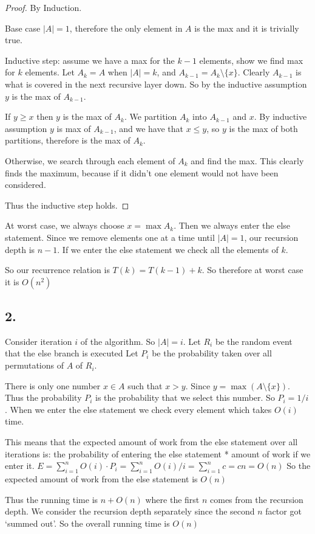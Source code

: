 \documentclass[11pt]{article}
\begin{document}
\begin{proof}
    By Induction.

    Base case $|A| = 1$, therefore the only element in $A$ is the max and it is trivially true.

    Inductive step: assume we have a max for the $k-1$ elements, show we find max for $k$ elements.
    Let $A_k = A$ when $|A| = k$, and $A_{k-1} = A_k \setminus \{x\}$.
    Clearly $A_{k-1}$ is what is covered in the next recursive layer down. 
    So by the inductive assumption $y$ is the max of $A_{k-1}$.

    If $y \geq x$ then $y$ is the max of $A_k$. We partition $A_k$ into $A_{k-1}$ and ${x}$.
    By inductive assumption $y$ is max of $A_{k-1}$, and we have that $x \leq y$, so $y$
    is the max of both partitions, therefore is the max of $A_k$.

    Otherwise, we search through each element of $A_k$ and find the max. This clearly
    finds the maximum, because if it didn't one element would not have been considered. 

    Thus the inductive step holds.
\end{proof}

At worst case, we always choose $x = \max A_k$. Then we always enter the else statement.
Since we remove elements one at a time until $|A| = 1$, our recursion depth is $n-1$.
If we enter the else statement we check all the elements of $k$.

So our recurrence relation is $T(k) = T(k-1) + k$. So therefore at worst case it is $O(n^2)$


\subsection*{2. }

Consider iteration $i$ of the algorithm. So $|A| = i$.
Let $R_i$ be the random event that the else branch is executed
Let $P_i$ be the probability taken over all permutations of $A$ of $R_i$.

There is only one number $x \in A$ such that $x > y$. Since $y = \max (A \setminus \{x\})$.
Thus the probability $P_i$ is the probability that we select this number. So $P_i = 1/i$.
When we enter the else statement we check every element which takes $O(i)$ time.

This means that the expected amount of work from the else statement over all iterations is:
the probability of entering the else statement * amount of work if we enter it.
$E = \sum_{i = 1} ^n O(i) \cdot P_i = \sum_{i = 1} ^n O(i)/i = \sum_{i = 1} ^n c = cn = O(n)$
So the expected amount of work from the else statement is $O(n)$

Thus the running time is $n + O(n)$ where the first $n$ comes from the recursion depth.
We consider the recursion depth separately since the second $n$ factor got `summed out'.
So the overall running time is $O(n)$
\end{document}
